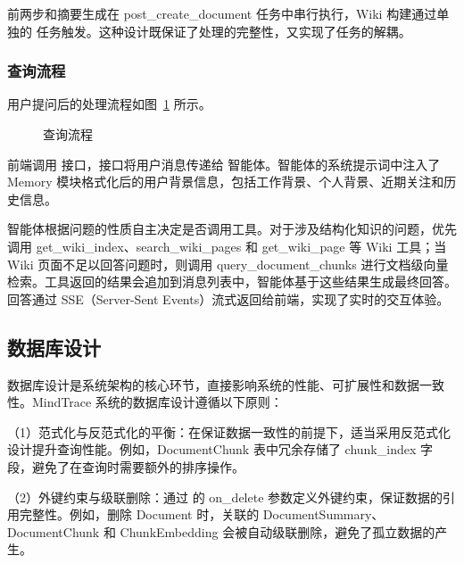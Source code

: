前两步和摘要生成在 post\_create\_document 任务中串行执行，Wiki 构建通过单独的  任务触发。这种设计既保证了处理的完整性，又实现了任务的解耦。

\subsubsection{查询流程}

用户提问后的处理流程如图~\ref{F.dataflow_query} 所示。

\begin{figure}[htb]
  \centering
  \caption{查询流程}
  \label{F.dataflow_query}
\end{figure}

前端调用  接口，接口将用户消息传递给  智能体。智能体的系统提示词中注入了 Memory 模块格式化后的用户背景信息，包括工作背景、个人背景、近期关注和历史信息。

智能体根据问题的性质自主决定是否调用工具。对于涉及结构化知识的问题，优先调用 get\_wiki\_index、search\_wiki\_pages 和 get\_wiki\_page 等 Wiki 工具；当 Wiki 页面不足以回答问题时，则调用 query\_document\_chunks 进行文档级向量检索。工具返回的结果会追加到消息列表中，智能体基于这些结果生成最终回答。回答通过 SSE（Server-Sent Events）流式返回给前端，实现了实时的交互体验。

\subsection{数据库设计}

数据库设计是系统架构的核心环节，直接影响系统的性能、可扩展性和数据一致性。MindTrace 系统的数据库设计遵循以下原则：

（1）范式化与反范式化的平衡：在保证数据一致性的前提下，适当采用反范式化设计提升查询性能。例如，DocumentChunk 表中冗余存储了 chunk\_index 字段，避免了在查询时需要额外的排序操作。

（2）外键约束与级联删除：通过  的 on\_delete 参数定义外键约束，保证数据的引用完整性。例如，删除 Document 时，关联的 DocumentSummary、DocumentChunk 和 ChunkEmbedding 会被自动级联删除，避免了孤立数据的产生。

